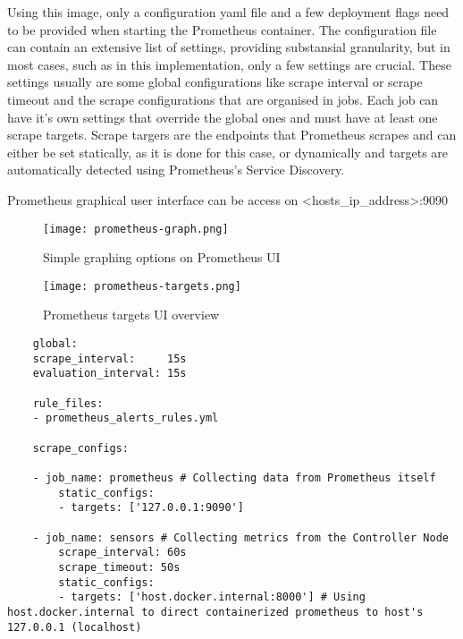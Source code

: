 Using this image, only a configuration yaml file and a few deployment flags need to be provided when starting the Prometheus container. The configuration file can contain an extensive list of settings, providing substansial granularity, but in most cases, such as in this implementation, only a few settings are crucial. These settings usually are some global configurations like scrape interval or scrape timeout and the scrape configurations that are organised in jobs. Each job can have it's own settings that override the global ones and must have at least one scrape targets. Scrape targers are the endpoints that Prometheus scrapes and can either be set statically, as it is done for this case, or dynamically and targets are automatically detected using Prometheus's Service Discovery.

Prometheus graphical user interface can be access on <hosts\_ip\_address>:9090

\begin{figure}[!h]
    \graphicspath{ {./screenshots/} }
    \texttt{[image: prometheus-graph.png]}
    \centering
    \caption{Simple graphing options on Prometheus UI}
    \label{fig:prom_graph}
\end{figure}

\begin{figure}[!h]
    \graphicspath{ {./screenshots/} }
    \texttt{[image: prometheus-targets.png]}
    \centering
    \caption{Prometheus targets UI overview}
    \label{fig:prom_targets}
\end{figure}

\begin{verbatim}
    global:
    scrape_interval:     15s
    evaluation_interval: 15s

    rule_files:
    - prometheus_alerts_rules.yml

    scrape_configs:

    - job_name: prometheus # Collecting data from Prometheus itself
        static_configs:
        - targets: ['127.0.0.1:9090']

    - job_name: sensors # Collecting metrics from the Controller Node
        scrape_interval: 60s
        scrape_timeout: 50s
        static_configs:
        - targets: ['host.docker.internal:8000'] # Using host.docker.internal to direct containerized prometheus to host's 127.0.0.1 (localhost)
\end{verbatim}

